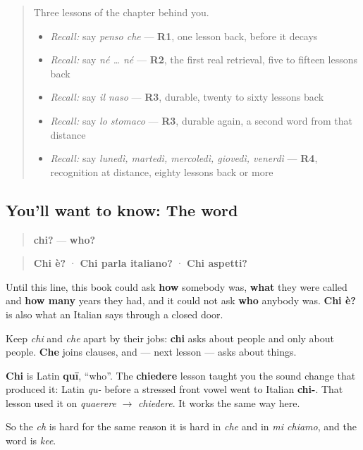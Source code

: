 \begin{quote}
Three lessons of the chapter behind you.

\begin{itemize}
\raggedright
  \item \emph{Recall:} say \emph{penso che} — \textbf{R1}, one lesson back, before it decays
  \item \emph{Recall:} say \emph{né … né} — \textbf{R2}, the first real retrieval, five to fifteen lessons back
  \item \emph{Recall:} say \emph{il naso} — \textbf{R3}, durable, twenty to sixty lessons back
  \item \emph{Recall:} say \emph{lo stomaco} — \textbf{R3}, durable again, a second word from that distance
  \item \emph{Recall:} say \emph{lunedì, martedì, mercoledì, giovedì, venerdì} — \textbf{R4}, recognition at distance, eighty lessons back or more
\end{itemize}
\end{quote}

\subsection*{You'll want to know: The word}
\begin{quote}
\textbf{chi?} — \textbf{who?}
\end{quote}

\begin{quote}
\textbf{Chi è?} · \textbf{Chi parla italiano?} · \textbf{Chi aspetti?}
\end{quote}

Until this line, this book could ask \textbf{how} somebody was, \textbf{what} they were called and \textbf{how many} years they had, and it could not ask \textbf{who} anybody was. \textbf{Chi è?} is also what an Italian says through a closed door.

Keep \emph{chi} and \emph{che} apart by their jobs: \textbf{chi} asks about people and only about people. \textbf{Che} joins clauses, and — next lesson — asks about things.

\begin{cousinweb}
\textbf{Chi} is Latin \textbf{quī}, \textquotedblleft{}who\textquotedblright{}. The \textbf{chiedere} lesson taught you the sound change that produced it: Latin \emph{qu-} before a stressed front vowel went to Italian \textbf{chi-}. That lesson used it on \emph{quaerere} $\to$ \emph{chiedere}. It works the same way here.

So the \emph{ch} is hard for the same reason it is hard in \emph{che} and in \emph{mi chiamo}, and the word is \emph{kee}.
\end{cousinweb}

